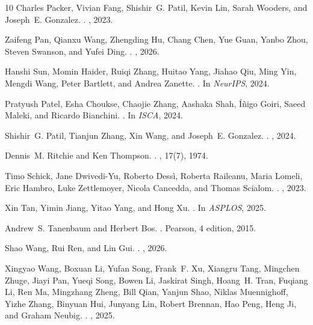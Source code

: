 \begin{thebibliography}{10}
Charles Packer, Vivian Fang, Shishir~G. Patil, Kevin Lin, Sarah Wooders, and
  Joseph~E. Gonzalez.
.
, 2023.

Zaifeng Pan, Qianxu Wang, Zhengding Hu, Chang Chen, Yue Guan, Yanbo Zhou,
  Steven Swanson, and Yufei Ding.
.
, 2026.

Hanshi Sun, Momin Haider, Ruiqi Zhang, Huitao Yang, Jiahao Qiu, Ming Yin,
  Mengdi Wang, Peter Bartlett, and Andrea Zanette.
.
\newblock In {\em NeurIPS}, 2024.

Pratyush Patel, Esha Choukse, Chaojie Zhang, Aashaka Shah, {\'I}{\~n}igo Goiri,
  Saeed Maleki, and Ricardo Bianchini.
.
\newblock In {\em ISCA}, 2024.

Shishir~G. Patil, Tianjun Zhang, Xin Wang, and Joseph~E. Gonzalez.
.
, 2024.

Dennis~M. Ritchie and Ken Thompson.
.
, 17(7), 1974.

Timo Schick, Jane Dwivedi-Yu, Roberto Dess{\`i}, Roberta Raileanu, Maria
  Lomeli, Eric Hambro, Luke Zettlemoyer, Nicola Cancedda, and Thomas Scialom.
.
, 2023.

Xin Tan, Yimin Jiang, Yitao Yang, and Hong Xu.
.
\newblock In {\em ASPLOS}, 2025.

Andrew~S. Tanenbaum and Herbert Bos.
.
\newblock Pearson, 4 edition, 2015.

Shao Wang, Rui Ren, and Lin Gui.
.
, 2026.

Xingyao Wang, Boxuan Li, Yufan Song, Frank~F. Xu, Xiangru Tang, Mingchen Zhuge,
  Jiayi Pan, Yueqi Song, Bowen Li, Jaskirat Singh, Hoang~H. Tran, Fuqiang Li,
  Ren Ma, Mingzhang Zheng, Bill Qian, Yanjun Shao, Niklas Muennighoff, Yizhe
  Zhang, Binyuan Hui, Junyang Lin, Robert Brennan, Hao Peng, Heng Ji, and
  Graham Neubig.
.
, 2025.


\end{thebibliography}
